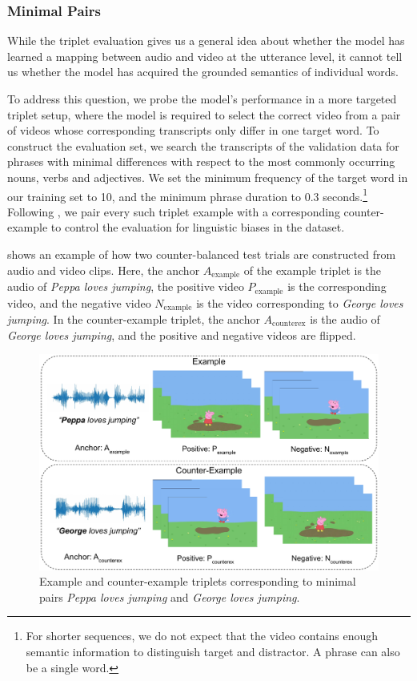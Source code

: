 \subsubsection{Minimal Pairs}
\label{sec:targeted}
While the triplet evaluation gives us a general idea about whether the model 
has learned a mapping between audio and video at the utterance level, it 
cannot tell us whether the model has acquired the grounded semantics 
of individual words.

To address this question, we probe the model's performance in a more targeted 
triplet setup, where the model is required to select the correct video from a 
pair of videos whose corresponding transcripts only differ in one target word.
To construct the evaluation set, we search the transcripts of the validation 
data for phrases with minimal differences with respect to the most commonly 
occurring nouns, verbs and adjectives. We set the minimum frequency of the 
target word in our training set to 10, and the minimum phrase duration to 0.3 
seconds.\footnote{For shorter sequences, we do not 
expect that the video contains enough semantic information to 
distinguish target and distractor. A phrase can also be a single word.}
Following \citet{nikolaus-fourtassi-2021-evaluating},
we pair every such triplet example with a corresponding counter-example to 
control the evaluation for linguistic biases in the dataset.


 shows an example of how two counter-balanced test
trials are constructed from audio and video clips. 
Here, the anchor $A_{\text{example}}$ of the example
triplet is the audio of \textit{Peppa loves jumping}, the positive video 
$P_{\text{example}}$ is the corresponding video, and the negative video 
$N_{\text{example}}$ is the video corresponding to \textit{George loves 
jumping}. In the counter-example triplet, the anchor $A_{\text{counterex}}$ is 
the audio of \textit{George loves jumping}, and the positive and negative videos 
are flipped.

\begin{figure}[ht]
  \centering
  \includegraphics[width=\columnwidth]{peppa_minimal_pairs.pdf}
  \caption{Example and counter-example triplets corresponding to minimal pairs {\it Peppa loves jumping} and {\it George loves jumping}.}
  \label{fig:minimal_pairs}
\end{figure}

